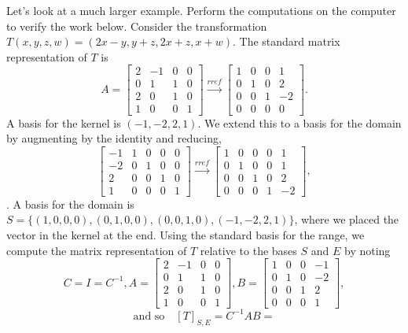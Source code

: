 \begin{example}
Let's look at a much larger example. 
Perform the computations on the computer to verify the work below. 
Consider the transformation $T(x,y,z,w)=(2x-y,y+z,2x+z,x+w)$.  
The standard matrix representation of $T$ is 
$$
A=
\begin{bmatrix}
 2 & -1 & 0 & 0 \\
 0 & 1 & 1 & 0 \\
 2 & 0 & 1 & 0 \\
 1 & 0 & 0 & 1
\end{bmatrix}
\xrightarrow{rref}
\begin{bmatrix}
 1 & 0 & 0 & 1 \\
 0 & 1 & 0 & 2 \\
 0 & 0 & 1 & -2 \\
 0 & 0 & 0 & 0
\end{bmatrix}
.$$ 
A basis for the kernel is $(-1,-2,2,1)$. 
We extend this to a basis for the domain by augmenting by the identity and reducing, 
$$
\begin{bmatrix}
 -1 & 1 & 0 & 0 & 0 \\
 -2 & 0 & 1 & 0 & 0 \\
 2 & 0 & 0 & 1 & 0 \\
 1 & 0 & 0 & 0 & 1
\end{bmatrix}
\xrightarrow{rref}
\begin{bmatrix}
 1 & 0 & 0 & 0 & 1 \\
 0 & 1 & 0 & 0 & 1 \\
 0 & 0 & 1 & 0 & 2 \\
 0 & 0 & 0 & 1 & -2
\end{bmatrix},
$$. 
A basis for the domain is $S=\{(1,0,0,0),(0,1,0,0),(0,0,1,0),(-1,-2,2,1)\}$, where we placed the vector in the kernel at the end. 
Using the standard basis for the range, we compute the matrix representation of $T$ relative to the bases $S$ and $E$ by noting 
$$C=I=C^{-1},
A=
\begin{bmatrix}
 2 & -1 & 0 & 0 \\
 0 & 1 & 1 & 0 \\
 2 & 0 & 1 & 0 \\
 1 & 0 & 0 & 1
\end{bmatrix}, 
B=
\begin{bmatrix}
 1 & 0 & 0 & -1 \\
 0 & 1 & 0 & -2 \\
 0 & 0 & 1 & 2 \\
 0 & 0 & 0 & 1
\end{bmatrix},$$
$$\text{and so}\quad [T]_{S,E} = C^{-1}AB= 
$$
\end{example}
